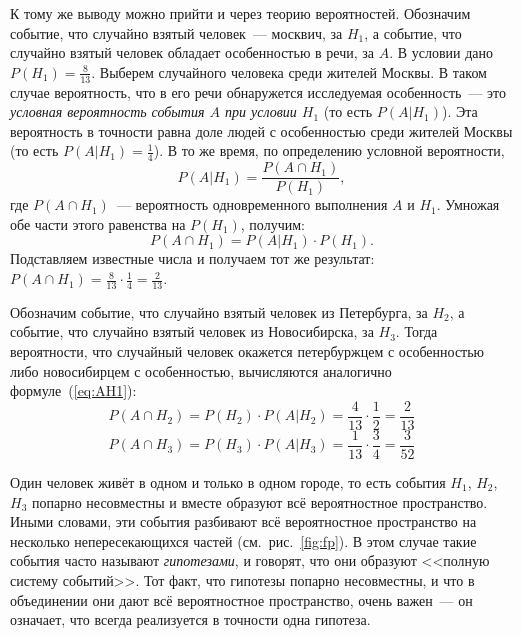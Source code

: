 \documentclass[11pt]{article}
\begin{document}
К тому же выводу можно прийти и через теорию вероятностей. Обозначим событие, что
случайно взятый человек~--- москвич, за $H_1$, а событие, что случайно взятый
человек обладает особенностью в речи, за $A$. В условии дано $P(H_1) = \frac{8}{13}$.
Выберем случайного человека среди жителей Москвы. В таком случае вероятность, что в
его речи обнаружется исследуемая особенность~--- это \emph{условная вероятность события
$A$ при условии $H_1$} (то есть $P(A \vert H_1)$). Эта вероятность в точности равна доле
людей с особенностью среди жителей Москвы (то есть $P(A \vert H_1) = \frac{1}{4}$).
В то же время, по определению условной вероятности,
\begin{equation}
	P(A \vert H_1)=\frac{P(A \cap H_1)}{P(H_1)},
\end{equation}
где $P(A \cap H_1)$~--- вероятность одновременного выполнения $A$ и $H_1$. Умножая
обе части этого равенства на $P(H_1)$, получим:
\begin{equation}\label{eq:AH1}
	P(A \cap H_1)=P(A \vert H_1) \cdot P(H_1).
\end{equation}
Подставляем известные числа и получаем тот же результат: $P(A \cap H_1) =
\frac{8}{13} \cdot \frac{1}{4} = \frac{2}{13}$.

Обозначим событие, что случайно взятый человек из Петербурга, за $H_2$, а событие, что
случайно взятый человек из Новосибирска, за $H_3$. Тогда вероятности, что случайный
человек окажется петербуржцем с особенностью либо новосибирцем с особенностью,
вычисляются аналогично формуле~(\ref{eq:AH1}):
$$
    P(A \cap H_2) = P(H_2) \cdot P(A \vert H_2) = \frac{4}{13} \cdot \frac{1}{2}
= \frac{2}{13}
$$
$$
    P(A \cap H_3) = P(H_3) \cdot P(A \vert H_3) = \frac{1}{13} \cdot \frac{3}{4}
= \frac{3}{52}
$$

Один человек живёт в одном и только в одном городе, то есть события $H_1$, $H_2$,
$H_3$ попарно несовместны и вместе образуют всё вероятностное пространство. Иными
словами, эти события разбивают всё вероятностное пространство на несколько
непересекающихся частей (см.~рис.~\ref{fig:fp}). В этом случае такие события часто
называют \emph{гипотезами}, и говорят, что они образуют <<полную систему событий>>.
Тот факт, что гипотезы попарно несовместны, и что в объединении они дают всё
вероятностное пространство, очень важен~--- он означает, что всегда реализуется в
точности одна гипотеза.
\end{document}
